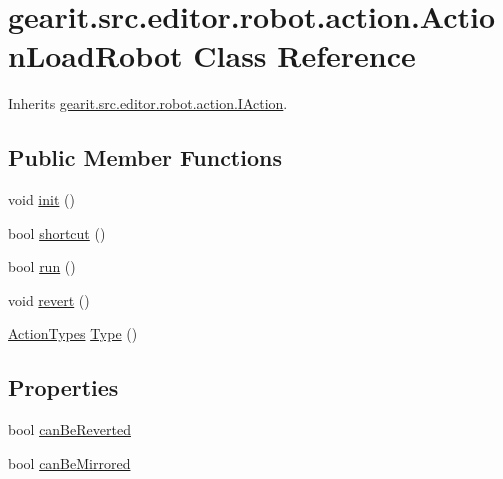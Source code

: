 \hypertarget{classgearit_1_1src_1_1editor_1_1robot_1_1action_1_1_action_load_robot}{\section{gearit.\+src.\+editor.\+robot.\+action.\+Action\+Load\+Robot Class Reference}
\label{classgearit_1_1src_1_1editor_1_1robot_1_1action_1_1_action_load_robot}
}


Inherits \hyperlink{interfacegearit_1_1src_1_1editor_1_1robot_1_1action_1_1_i_action}{gearit.\+src.\+editor.\+robot.\+action.\+I\+Action}.

\subsection*{Public Member Functions}
\begin{DoxyCompactItemize}
\item 
void \hyperlink{classgearit_1_1src_1_1editor_1_1robot_1_1action_1_1_action_load_robot_ade0e7a5a1addfb29fd1c17c979232aca}{init} ()
\item 
bool \hyperlink{classgearit_1_1src_1_1editor_1_1robot_1_1action_1_1_action_load_robot_ac8717be0f22beed0662115e67c18a8a4}{shortcut} ()
\item 
bool \hyperlink{classgearit_1_1src_1_1editor_1_1robot_1_1action_1_1_action_load_robot_a8b2afcb7544868cec5ccbab23a10d1b3}{run} ()
\item 
void \hyperlink{classgearit_1_1src_1_1editor_1_1robot_1_1action_1_1_action_load_robot_ac6bd64998d9fbd4cfdb2eba12e9816e9}{revert} ()
\item 
\hyperlink{namespacegearit_1_1src_1_1editor_1_1robot_1_1action_a4be0fd46e3952d6135136b20e7b3fc5e}{Action\+Types} \hyperlink{classgearit_1_1src_1_1editor_1_1robot_1_1action_1_1_action_load_robot_a0318447bf091bd9b72377ebdb37a55b2}{Type} ()
\end{DoxyCompactItemize}
\subsection*{Properties}
\begin{DoxyCompactItemize}
\item 
bool \hyperlink{classgearit_1_1src_1_1editor_1_1robot_1_1action_1_1_action_load_robot_a01c1977199ba3a4c440f181a59929634}{can\+Be\+Reverted}
\item 
bool \hyperlink{classgearit_1_1src_1_1editor_1_1robot_1_1action_1_1_action_load_robot_a7b216c6a65cb62d3dbb51b1e1835f9a8}{can\+Be\+Mirrored}
\end{DoxyCompactItemize}


